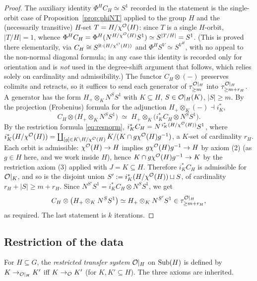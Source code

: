 \begin{proof}
The auxiliary identity $\Phi^H C_H\simeq S^1$ recorded in the statement is the
single-orbit case of Proposition~\ref{prop:phiNT} applied to the group $H$ and
the (necessarily transitive) $H$-set $T=H/\chi^{\mathcal{O}}(H)$: since $T$ is a single
$H$-orbit, $|T/H|=1$, whence $\Phi^H C_H=\Phi^H(N^{H/\chi^{\mathcal{O}}(H)}S^1)\simeq
S^{|T/H|}=S^1$. (This is proved there elementarily, via
$C_H\cong S^{\mathbb{R}\cdot(H/\chi^{\mathcal{O}}(H))}$ and $\Phi^HS^V\simeq S^{V^H}$, with no
appeal to the non-normal diagonal formula; in any case this identity is recorded
only for orientation and is \emph{not} used in the degree-shift argument that
follows, which relies solely on cardinality and admissibility.) The functor $C_H\otimes(-)$ preserves colimits and
retracts, so it suffices to send each generator of $\tau^{\mathcal{O}|_H}_{\ge m}$ into
$\tau^{\mathcal{O}|_H}_{\ge m+r_H}$. A generator has the form $H_+\otimes_K N^S S^1$ with
$K\subseteq H$, $S\in\mathcal{O}|_H(K)$, $|S|\ge m$. By the projection (Frobenius)
formula for the adjunction $H_+\otimes_K(-)\dashv i_K^\ast$,
\[
C_H\otimes\bigl(H_+\otimes_K N^S S^1\bigr)\;\simeq\;
H_+\otimes_K\bigl(i_K^\ast C_H\otimes N^S S^1\bigr).
\]
By the restriction formula \eqref{eq:resnorm},
$i_K^\ast C_H=N^{\,i_K^\ast(H/\chi^{\mathcal{O}}(H))}S^1$, where
$i_K^\ast(H/\chi^{\mathcal{O}}(H))=\coprod_{[g]\in K\backslash H/\chi^{\mathcal{O}}(H)}
K/(K\cap g\chi^{\mathcal{O}}(H)g^{-1})$, a $K$-set of cardinality $r_H$. Each orbit is
admissible: $\chi^{\mathcal{O}}(H)\to H$ implies $g\chi^{\mathcal{O}}(H)g^{-1}\to H$ by axiom (2)
(as $g\in H$ here, and we work inside $H$), hence
$K\cap g\chi^{\mathcal{O}}(H)g^{-1}\to K$ by the restriction axiom (3) applied with
$J=K\subseteq H$. Therefore $i_K^\ast C_H$ is admissible for $\mathcal{O}|_K$, and so is
the disjoint union $S':=i_K^\ast(H/\chi^{\mathcal{O}}(H))\sqcup S$, of cardinality
$r_H+|S|\ge m+r_H$. Since $N^{S'}S^1=i_K^\ast C_H\otimes N^S S^1$, we get
\[
C_H\otimes\bigl(H_+\otimes_K N^S S^1\bigr)\simeq H_+\otimes_K N^{S'}S^1
\in\tau^{\mathcal{O}|_H}_{\ge m+r_H},
\]
as required. The last statement is $k$ iterations.
\end{proof}

\subsection*{Restriction of the data}

\begin{qfivedefinition}\label{def:restr}
For $H\subseteq G$, the \emph{restricted transfer system} $\mathcal{O}|_H$ on
$\operatorname{Sub}(H)$ is defined by $K\to_{\mathcal{O}|_H}K'$ iff $K\to_{\mathcal{O}}K'$ (for $K,K'\subseteq
H$). The three axioms are inherited.
\end{qfivedefinition}

